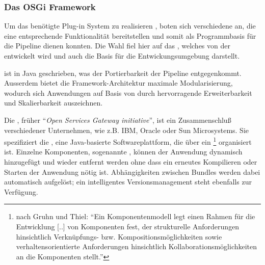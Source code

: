 \subsubsection{Das OSGi Framework}

Um das benötigte Plug-in System zu realisieren , boten
sich verschiedene  an, die eine entsprechende Funktionalität
bereitstellen und somit als Programmbasis für die  Pipeline dienen konnten.
Die Wahl fiel hier auf das  , welches von
der  entwickelt wird und auch die Basis für die
Entwickungsumgebung  darstellt.

 ist in Java geschrieben, was der Portierbarkeit der
Pipeline entgegenkommt. Ausserdem bietet die Framework-Architektur maximale
Modularisierung, wodurch sich Anwendungen auf Basis von 
durch hervorragende Erweiterbarkeit und Skalierbarkeit auszeichnen.


Die , früher \enquote{\textit{Open Services Gateway
initiative}}, ist ein Zusammenschluß verschiedener Unternehmen, wie z.B. IBM,
Oracle oder Sun Microsystems.
Sie spezifiziert die , eine Java-basierte
Softwareplattform, die über ein 
\footnote{nach Gruhn und Thiel\citep{gruhn_komponentenmodelle_2000}:
\enquote{Ein Komponentenmodell legt einen Rahmen für die Entwicklung [..] von
Komponenten fest, der strukturelle Anforderungen hinsichtlich Verknüpfungs-
bzw. Kompositionsmöglichkeiten sowie verhaltensorientierte Anforderungen
hinsichtlich Kollaborationsmöglichkeiten an die Komponenten stellt.}}
organisiert ist.
\citep{wtherich_die_2008}
Einzelne Komponenten, sogenannte , können der Anwendung
dynamisch hinzugefügt und wieder entfernt werden ohne dass ein erneutes
Kompilieren oder Starten der Anwendung nötig ist.
Abhängigkeiten zwischen Bundles werden dabei automatisch aufgelöst; ein
intelligentes Versionsmanagement steht ebenfalls zur Verfügung.

